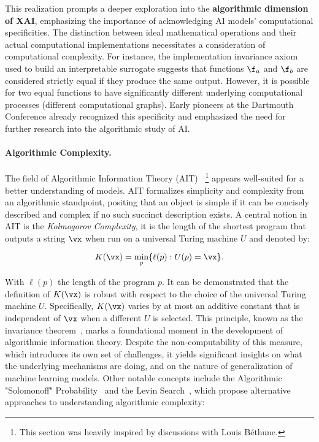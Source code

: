 This realization prompts a deeper exploration into the \textbf{algorithmic dimension of XAI}, emphasizing the importance of acknowledging AI models' computational specificities. The distinction between ideal mathematical operations and their actual computational implementations necessitates a consideration of computational complexity. For instance, the implementation invariance axiom used to build an interpretable surrogate suggests that functions $\f_a$ and $\f_b$ are considered strictly equal if they produce the same output. However, it is possible for two equal functions to have significantly different underlying computational processes (different computational graphs). Early pioneers at the Dartmouth Conference already recognized this specificity and emphasized the need for further research into the algorithmic study of AI.

\paragraph{Algorithmic Complexity.} The field of Algorithmic Information Theory (AIT)~\cite{chaitin1977algorithmic,grunwald2008algorithmic} \footnote{This section was heavily inspired by discussions with Louis Béthune.} appears well-suited for a better understanding of models. AIT formalizes simplicity and complexity from an algorithmic standpoint, positing that an object is simple if it can be concisely described and complex if no such succinct description exists. A central notion in AIT is the \textit{Kolmogorov Complexity}, it is the length of the shortest program that outputs a string $\vx$ when run on a universal Turing machine $U$ and denoted by:

$$K(\vx) = \min_{p} \{ \ell(p) : U(p) = \vx \}.$$

With $\ell(p)$ the length of the program $p$. It can be demonstrated that the definition of $K(\vx)$ is robust with respect to the choice of the universal Turing machine $U$. Specifically, $K(\vx)$ varies by at most an additive constant that is independent of $\vx$ when a different $U$ is selected. This principle, known as the invariance theorem~\cite{solomonoff1964formal,kolmogorov1965three,chaitin1969length}, marks a foundational moment in the development of algorithmic information theory. Despite the non-computability of this measure, which introduces its own set of challenges, it yields significant insights on what the underlying mechanisms are doing, and on the nature of generalization of machine learning models. Other notable concepts include the Algorithmic "Solomonoff" Probability~\cite{solomonoff1997discovery} and the Levin Search~\cite{levin1973universal}, which propose alternative approaches to understanding algorithmic complexity:

